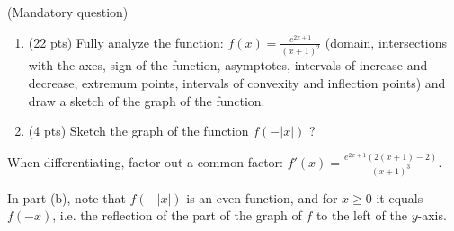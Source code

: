 
\begin{question}
(Mandatory question)
\begin{enumerate}
  \item (22 pts) Fully analyze the function: $\displaystyle f(x)=\frac{e^{2x+1}}{(x+1)^2}$ (domain, intersections with the axes, sign of the function, asymptotes, intervals of increase and decrease, extremum points, intervals of convexity and inflection points) and draw a sketch of the graph of the function.
  \item (4 pts) Sketch the graph of the function $f(-|x|)$ ?
\end{enumerate}
\end{question}

\begin{hint}
When differentiating, factor out a common factor: $f'(x)=\frac{e^{2x+1}\left(2(x+1)-2\right)}{(x+1)^3}$.
\end{hint}

\begin{hint}
In part (b), note that $f(-|x|)$ is an even function, and for $x\ge0$ it equals $f(-x)$, i.e. the reflection of the part of the graph of $f$ to the left of the $y$-axis.
\end{hint}

